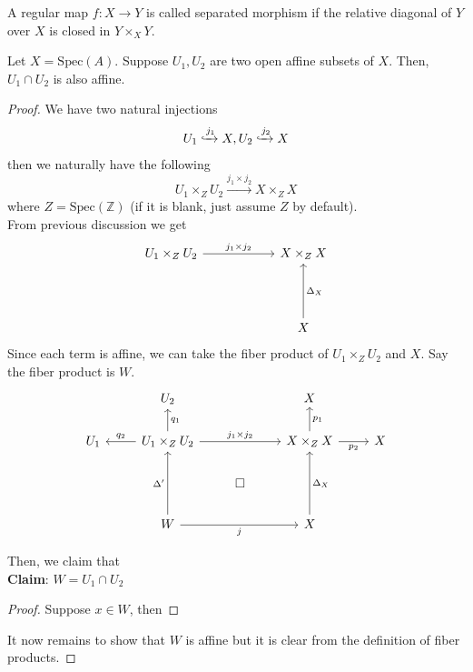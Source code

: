 \documentclass[oneside, 12pt]{scrbook}
\newcommand{\ZZ}{\mathbb Z}
\newcommand{\spec}{\mathrm{Spec}}
\theoremstyle{theorem}
\begin{document}
\begin{definition}
A regular map $f: X \rightarrow Y$ is called separated morphism if the relative diagonal of $Y$ over $X$ is closed in $Y \times_{X} Y$.
\end{definition}

\begin{lemma}
Let $X = \spec(A)$. Suppose $U_{1},U_{2}$ are two open affine subsets of $X$. Then, $U_{1}\cap U_{2}$ is also affine.
\end{lemma}

\begin{proof}
We have two natural injections $$U_{1} \xhookrightarrow{j_{1}} X , U_{2} \xhookrightarrow{j_{2}} X$$ then we naturally have the following $$U_{1} \times_{Z} U_{2} \xrightarrow{j_{1} \times j_{2}} X \times_{Z} X $$ where $Z = \spec(\ZZ)$ (if it is blank, just assume $Z$ by default). \\
From previous discussion we get 
\[\begin{tikzcd}
	{U_{1}\times_{Z}U_{2}} & {} & {X\times_{Z}X} \\
	{} && {} \\
	&& X
	\arrow["{j_{1}\times j_{2}}", from=1-1, to=1-3]
	\arrow["{\Delta_{X}}"', from=3-3, to=1-3]
\end{tikzcd}\]
Since each term is affine, we can take the fiber product of $U_{1}\times_{Z}U_{2}$ and $X$. Say the fiber product is $W$.
\[\begin{tikzcd}
	& {U_{2}} && X \\
	{U_{1}} & {U_{1}\times_{Z}U_{2}} & {} & {X\times_{Z}X} & X \\
	& {} & \square & {} \\
	& W && X
	\arrow["{\Delta_{X}}"', from=4-4, to=2-4]
	\arrow["{j_{1}\times j_{2}}", from=2-2, to=2-4]
	\arrow["{\Delta'}", from=4-2, to=2-2]
	\arrow["j"', from=4-2, to=4-4]
	\arrow["{p_{1}}"', from=2-4, to=1-4]
	\arrow["{p_{2}}"', from=2-4, to=2-5]
	\arrow["{q_{2}}"', from=2-2, to=2-1]
	\arrow["{q_{1}}"', from=2-2, to=1-2]
\end{tikzcd}\]

Then, we claim that \\

\textbf{Claim}: $W = U_{1} \cap U_{2}$

\begin{proof}
Suppose $x\in W$, then 
\end{proof}

It now remains to show that $W$ is affine but it is clear from the definition of fiber products.

\end{proof}
\end{document}
